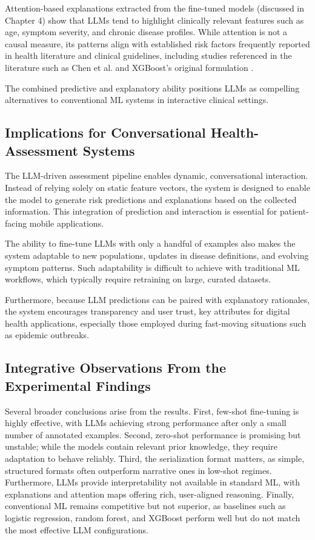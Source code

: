 Attention-based explanations extracted from the fine-tuned models (discussed in Chapter 4) show that LLMs tend to highlight clinically relevant features such as age, symptom severity, and chronic disease profiles. While attention is not a causal measure, its patterns align with established risk factors frequently reported in health literature and clinical guidelines, including studies referenced in the literature such as Chen et al. and XGBoost's original formulation \cite{chen2016xgboost}.

The combined predictive and explanatory ability positions LLMs as compelling alternatives to conventional ML systems in interactive clinical settings.

\subsection{Implications for Conversational Health-Assessment Systems}
The LLM-driven assessment pipeline enables dynamic, conversational interaction. Instead of relying solely on static feature vectors, the system is designed to enable the model to generate risk predictions and explanations based on the collected information. This integration of prediction and interaction is essential for patient-facing mobile applications.

The ability to fine-tune LLMs with only a handful of examples also makes the system adaptable to new populations, updates in disease definitions, and evolving symptom patterns. Such adaptability is difficult to achieve with traditional ML workflows, which typically require retraining on large, curated datasets.

Furthermore, because LLM predictions can be paired with explanatory rationales, the system encourages transparency and user trust, key attributes for digital health applications, especially those employed during fast-moving situations such as epidemic outbreaks.

\subsection{Integrative Observations From the Experimental Findings}
Several broader conclusions arise from the results. First, few-shot fine-tuning is highly effective, with LLMs achieving strong performance after only a small number of annotated examples. Second, zero-shot performance is promising but unstable; while the models contain relevant prior knowledge, they require adaptation to behave reliably. Third, the serialization format matters, as simple, structured formats often outperform narrative ones in low-shot regimes. Furthermore, LLMs provide interpretability not available in standard ML, with explanations and attention maps offering rich, user-aligned reasoning. Finally, conventional ML remains competitive but not superior, as baselines such as logistic regression, random forest, and XGBoost perform well but do not match the most effective LLM configurations.

